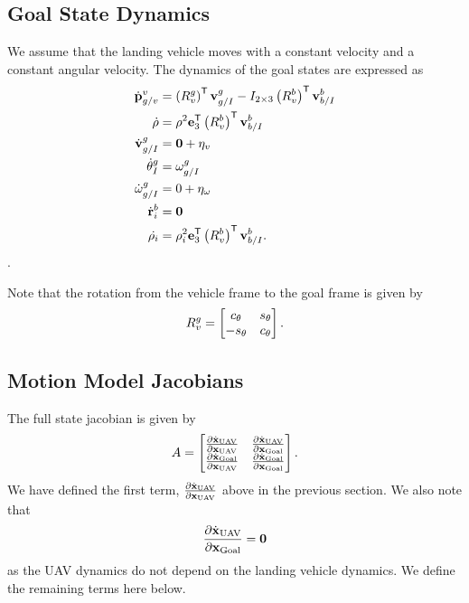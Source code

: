 \subsection{Goal State Dynamics}
We assume that the landing vehicle moves with a constant velocity and a constant
angular velocity. The dynamics of the goal states are expressed as
\begin{align}
  \dot{\boldsymbol{\mathrm{p}}}_{g/v}^{v} &= \left(R_{v}^{g}\right)^{\mathsf{T}}
  \boldsymbol{\mathrm{v}}_{g/I}^{g} - I_{2 \times 3}\left(R_{v}^{b}\right)^{\mathsf{T}} \boldsymbol{\mathrm{v}}_{b/I}^{b} \\
  \dot{\rho} &= \rho^{2} \boldsymbol{\mathrm{e}}_{3}^{\mathsf{T}} \left(R_{v}^{b}\right)^{\mathsf{T}} \boldsymbol{\mathrm{v}}_{b/I}^{b} \\
  \dot{\boldsymbol{\mathrm{v}}}_{g/I}^{g} &= \boldsymbol{\mathrm{0}} + \eta_{v} \\
  \dot{\theta}_{I}^{g} &= \omega_{g/I}^g \\
  \dot{\omega}_{g/I}^{g} &= 0 + \eta_{\omega} \\
  \dot{\boldsymbol{\mathrm{r}}}_{i}^{b} &= \boldsymbol{\mathrm{0}} \\
  \dot{\rho_i} &= \rho_i^{2} \boldsymbol{\mathrm{e}}_{3}^{\mathsf{T}}
    \left(R_{v}^{b}\right)^{\mathsf{T}} \boldsymbol{\mathrm{v}}_{b/I}^{b}.
\end{align}.

Note that the rotation from the vehicle frame to the goal frame is given by
\begin{equation}
  R_v^g =
  \begin{bmatrix}
    c_\theta & s_\theta \\
    -s_\theta & c_\theta
  \end{bmatrix}.
\end{equation}

\subsection{Motion Model Jacobians}
The full state jacobian is given by
\begin{equation}
  A =
  \begin{bmatrix}
    \frac{\partial \dot{\boldsymbol{\mathrm{x}}}_{\text{UAV}}}{\partial \boldsymbol{\mathrm{x}}_{\text{UAV}}} &
    \frac{\partial \dot{\boldsymbol{\mathrm{x}}}_{\text{UAV}}}{\partial \boldsymbol{\mathrm{x}}_{\text{Goal}}} \\
    \frac{\partial \dot{\boldsymbol{\mathrm{x}}}_{\text{Goal}}}{\partial \boldsymbol{\mathrm{x}}_{\text{UAV}}} &
    \frac{\partial \dot{\boldsymbol{\mathrm{x}}}_{\text{Goal}}}{\partial \boldsymbol{\mathrm{x}}_{\text{Goal}}} 
  \end{bmatrix}.
\end{equation}
We have defined the first term, $\frac{\partial \dot{\boldsymbol{\mathrm{x}}}_{\text{UAV}}}{\partial
\boldsymbol{\mathrm{x}}_{\text{UAV}}}$ above in the previous section. We also note that
\begin{equation}
  \frac{\partial \dot{\boldsymbol{\mathrm{x}}}_{\text{UAV}}}{\partial \boldsymbol{\mathrm{x}}_{\text{Goal}}} = \boldsymbol{\mathrm{0}}
\end{equation}
as the UAV dynamics do not depend on the landing vehicle dynamics. We define the
remaining terms here below.

